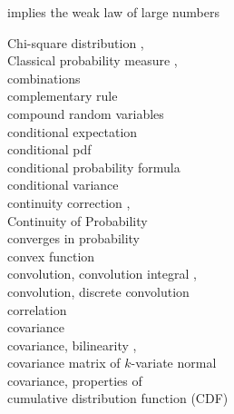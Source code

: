 \documentclass[12pt]{article}
\begin{document}
\quad implies the weak law of large numbers \pageref{cltimplieswlln}

\noindent Chi-square distribution \pageref{chisquare1}, \pageref{chisquare2}\\
\noindent Classical probability measure \pageref{classicalprobmeasure1}, \pageref{classicalprobmeasure2}\\
\noindent combinations \pageref{sec:combinations}\\
\noindent complementary rule \pageref{complementaryrule}\\
\noindent compound random variables \pageref{compoundrv}\\
\noindent conditional expectation \pageref{conditionalexpectation}\\
\noindent conditional pdf \pageref{conditionalpdf}\\
\noindent conditional probability formula \pageref{conditionalprobabilityformula}\\
\noindent conditional variance \pageref{conditionalvariance}\\
\noindent continuity correction \pageref{continuitycorrection1}, \pageref{continuitycorrection2}\\
\noindent Continuity of Probability \pageref{continuityofprobability}\\
\noindent converges in probability \pageref{convergesinprob}\\
\noindent convex function \pageref{convexfunction}\\
\noindent convolution, convolution integral \pageref{convolutionintegral}, \pageref{s:convolutionintegral}\\
\noindent convolution, discrete convolution \pageref{discreteconvolution}\\
\noindent correlation \pageref{correlation}\\
\noindent covariance \pageref{covariance}\\
\noindent covariance, bilinearity \pageref{covbilinear}, \pageref{covbilinearity}\\
\noindent covariance matrix of $k$-variate normal \pageref{covariancematrix}\\
\noindent covariance, properties of \pageref{covarianceproperties}\\
\noindent cumulative distribution function (CDF) \pageref{cdfs}\\
\end{document}
